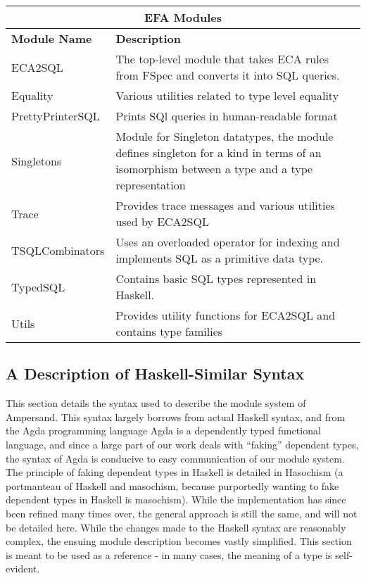 \begin{adjustbox}{center}
\begin{tabular}{ |p{3.2cm}|p{11cm}|  }
\hline
\multicolumn{2}{|c|}{\bfseries{\large{EFA Modules}}} \\
\hline\hline
\bfseries{Module Name} & \bfseries{Description}\\
\hline
ECA2SQL & The top-level module that takes ECA rules from FSpec and 
converts it into SQL queries.    \\ 
\hline
Equality & Various utilities related to type level equality   \\ 
\hline
PrettyPrinterSQL & Prints SQl queries in human-readable format    \\ 
\hline
Singletons & Module for Singleton datatypes, the module defines 
singleton for a kind in terms of an isomorphism between a type and a 
type representation   \\ 
\hline
Trace & Provides trace messages and various utilities used by 
ECA2SQL    \\ 
\hline
TSQLCombinators & Uses an overloaded operator for indexing and 
implements SQL as a primitive data type.   \\ 
\hline
TypedSQL & Contains basic SQL types represented in Haskell.    \\ 
\hline
Utils & Provides utility functions for ECA2SQL and contains type 
families    \\ 
\hline
\end{tabular}
\end{adjustbox}

\noindent
\subsection{A Description of Haskell-Similar Syntax}\label{subsec:HaskellSyntax}

This section details the syntax used to describe the module system of
Ampersand. This syntax largely borrows from actual Haskell syntax, and from the
Agda programming language%
Agda is a dependently typed functional
language, and since a large part of our work deals with ``faking'' dependent
types, the syntax of Agda is conducive to easy communication of our module 
system. The
principle of faking dependent types in Haskell is detailed in
Hasochism \citep{hasochism} 
(a portmanteau of Haskell and masochism, because
purportedly wanting to fake dependent types in Haskell is masochism). While the
implementation has since been refined many times over, the general approach is 
still the
same, and will not be detailed here.
While the changes made to the Haskell syntax are reasonably complex, the 
ensuing 
module description becomes vastly simplified. This section is meant to be used
as a reference - in many cases, the meaning of a type is self-evident. 

